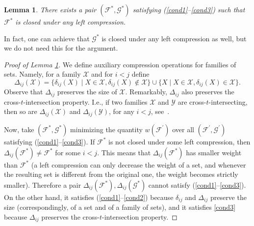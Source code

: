 \documentclass[12pt]{article}
\def\X{{\mathcal X}}
\def\Y{{\mathcal Y}}
\def\F{{\mathcal F}}
\def\G{{\mathcal G}}
\def\X{\ensuremath{{\mathcal X}}}
\newtheorem{lemma}[theorem]{Lemma}
\begin{document}
\begin{lemma} 
\label{maximal_compressed}
There exists a pair $(\F^*, \G^*)$ satisfying \textup{(\ref{cond1}--\ref{cond3})} such that $\F^*$ is closed under any left compression.
\end{lemma}
In fact, one can achieve that $\G^*$ is closed under any left compression as well, but we do not need this for the argument.
\begin{proof}[Proof of Lemma \ref{maximal_compressed}]
We define auxiliary compression operations for families of sets. Namely, for a family $\X$ and for $i < j$ define
$$\Delta_{ij}(\mathcal{X}) = \{\delta_{ij}(X) \mid X\in\X, \delta_{ij}(X)\notin \X\}
\cup \{ X \mid X\in\X, \delta_{ij}(X)\in \X\}.$$
Observe that $\Delta_{ij}$ preserves the size of $\X$. Remarkably, $\Delta_{ij}$ also preserves the cross-$t$-intersection property. I.e., if two families $\X$ and $\Y$ are cross-$t$-intersecting, then so are $\Delta_{ij}(\X)$ and $\Delta_{ij}(\Y)$, for any $i < j$, see~\cite[Lemma 2.1]{Borg2014TheMP}.

Now, take $(\F^*, \G^*)$ minimizing the quantity $w(\F^\prime)$ over all $(\F^\prime, \G^\prime)$ satisfying (\ref{cond1}--\ref{cond3}). If $\F^*$ is not closed under some left compression, then $\Delta_{ij}(\F^*) \neq \F^*$ for some $i < j$.
This means that $\Delta_{ij}(\F^*)$ has smaller weight than $\F^*$ (a left compression can only decrease the weight of a set, and whenever the resulting set is different from the original one, the weight becomes strictly smaller). 
 Therefore a pair $\Delta_{ij}(\F^*), \Delta_{ij}(\G^*)$ cannot satisfy (\ref{cond1}--\ref{cond3}). On the other hand, it satisfies  (\ref{cond1}--\ref{cond2}) because $\delta_{ij}$ and $\Delta_{ij}$ preserve the size (correspondingly, of a set and of a family of sets), and it satisfies \eqref{cond3} because $\Delta_{ij}$ preserves the cross-$t$-intersection property.
\end{proof}
\end{document}
